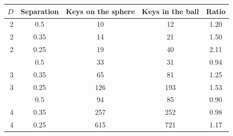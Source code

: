 \begin{tabular}{rcccc}
\toprule
$D$ & Separation & Keys on the sphere & Keys in the ball & Ratio \\
\midrule
2 & 0.5 & 10 & 12 & 1.20 \\
2 & 0.35 & 14 & 21 & 1.50 \\
2 & 0.25 & 19 & 40 & 2.11 \\
\addlinespace
3 & 0.5 & 33 & 31 & 0.94 \\
3 & 0.35 & 65 & 81 & 1.25 \\
3 & 0.25 & 126 & 193 & 1.53 \\
\addlinespace
4 & 0.5 & 94 & 85 & 0.90 \\
4 & 0.35 & 257 & 252 & 0.98 \\
4 & 0.25 & 615 & 721 & 1.17 \\
\bottomrule
\end{tabular}
